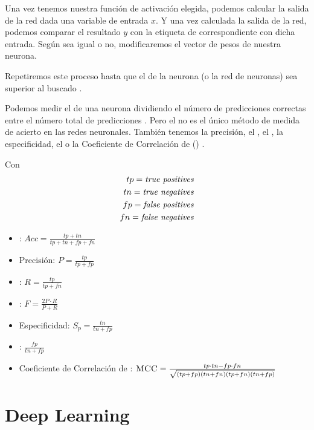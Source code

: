 \begin{enumerate}
        Una vez tenemos nuestra función de activación elegida, podemos calcular la salida de la red dada una variable de entrada $x$. Y una vez calculada la salida de la red, podemos comparar el resultado $y$ con la etiqueta de  correspondiente con dicha entrada. Según sea igual o no, modificaremos el vector de pesos de nuestra neurona.

        Repetiremos este proceso hasta que el  de la neurona (o la red de neuronas) sea superior al  buscado .

        Podemos medir el  de una neurona dividiendo el número de predicciones correctas entre el número total de predicciones . Pero el  no es el único método de medida de acierto en las redes neuronales. También tenemos la precisión, el , el , la especificidad, el  o la Coeficiente de Correlación de  () .

        Con
        \begin{align*}
          tp = {\textit{true positives}}  \\
          tn = {\textit{true negatives}}  \\
          fp = {\textit{false positives}} \\
          fn = {\textit{false negatives}}
        \end{align*}

        \begin{itemize}
          \item {}: $Acc = \frac{tp + tn}{tp + tn + fp + fn}$
          \item Precisión: $P = \frac{tp}{tp + fp}$
          \item {}: $R = \frac{tp}{tp+ fn}$
          \item {}: $F = \frac{2P \cdot R}{P + R}$
          \item Especificidad: $S_p = \frac{tn}{tn + fp}$
          \item {}: $\frac{fp}{tn + fp}$
          \item Coeficiente de Correlación de : ${\textsc{MCC}} = \frac{tp \cdot tn - fp \cdot fn}{\sqrt{(tp + fp)(tn + fn)(tp + fn)(tn + fp)}}$
        \end{itemize}
\end{enumerate}

\section{Deep Learning}

